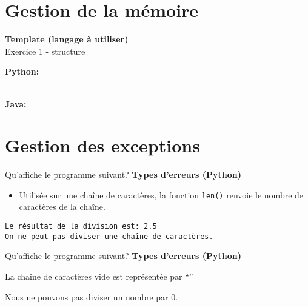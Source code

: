 \section{Gestion de la mémoire}

\begin{Exercice}[5 minutes] \textbf{Template (langage à utiliser)}\\
    Exercice 1 - structure \\
    
     \begin{conseil}
         
     \end{conseil}
     \begin{solution}
     
     \textbf{Python:} 
     
     \textbf{\\Java:} 
        
         
     \end{solution}   
 \end{Exercice}

\section{Gestion des exceptions}

\begin{Exercice}[5 minutes] Qu'affiche le programme suivant? \textbf{Types d'erreurs (Python)}\\
      
     \begin{conseil}
        \begin{itemize}
            \item Utilisée sur une chaîne de caractères, la fonction \lstinline{len()} renvoie le nombre de caractères de la chaîne. 
        \end{itemize}  
       
    \end{conseil}
     \begin{solution}
        \lstinline{Le résultat de la division est: 2.5}\\
        \lstinline{On ne peut pas diviser une chaîne de caractères.}
     \end{solution}   
 \end{Exercice}

\begin{Exercice}[5 minutes] Qu'affiche le programme suivant? \textbf{Types d'erreurs (Python)}\\
    
    
     \begin{conseil}
         La chaîne de caractères vide est représentée par ``'' 
    \end{conseil}
     \begin{solution}
        Nous ne pouvons pas diviser un nombre par 0.
     \end{solution}   
 \end{Exercice}

